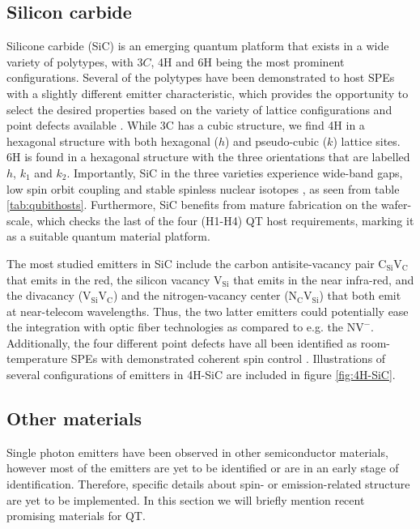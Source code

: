 \subsection{Silicon carbide}

Silicone carbide (SiC) is an emerging quantum platform that exists in a wide variety of polytypes, with $3C$, 4H and 6H being the most prominent configurations. Several of the polytypes have been demonstrated to host SPEs  with a slightly different emitter characteristic, which provides the opportunity to select the desired properties based on the variety of lattice configurations and point defects available \cite{Weber2010, Son2020, Falk2013}. While 3C has a cubic structure, we find 4H in a hexagonal structure with both hexagonal ($h$) and pseudo-cubic ($k$) lattice sites. 6H is found in a hexagonal structure with the three orientations that are labelled $h$, $k_1$ and $k_2$. Importantly, SiC in the three varieties experience wide-band gaps, low spin orbit coupling and stable spinless nuclear isotopes \cite{Neudeck1995, Weber2010, Martienssen2005}, as seen from table \ref{tab:qubithosts}. Furthermore, SiC benefits from mature fabrication on the wafer-scale, which checks the last of the four (H1-H4) QT host requirements, marking it as a suitable quantum material platform.


The most studied emitters in SiC include the carbon antisite-vacancy pair $\text{C}_{\text{Si}}\text{V}_{\text{C}}$ that emits in the red, the silicon vacancy $\text{V}_{\text{Si}}$ that emits in the near infra-red, and the divacancy ($\text{V}_{\text{Si}}\text{V}_{\text{C}}$) and the nitrogen-vacancy center ($\text{N}_{\text{C}}\text{V}_{\text{Si}}$) that both emit at near-telecom wavelengths. Thus, the two latter emitters could potentially ease the integration with optic fiber technologies as compared to e.g. the $\text{NV}^{-}$. Additionally, the four different point defects have all been identified as room-temperature SPEs with demonstrated coherent spin control \cite{Widmann2014, }. Illustrations of several configurations of emitters in 4H-SiC are included in figure \ref{fig:4H-SiC}.

\subsection{Other materials}

Single photon emitters have been observed in other semiconductor materials, however most of the emitters are yet to be identified or are in an early stage of identification. Therefore, specific details about spin- or emission-related structure are yet to be implemented. In this section we will briefly mention recent promising materials for QT.

